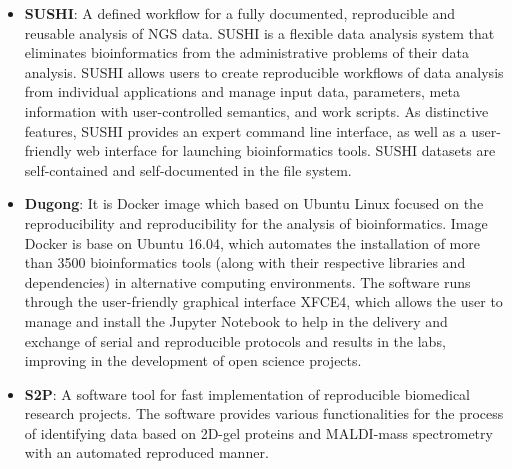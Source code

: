 \begin{itemize}
    \item \textbf{SUSHI}\cite{DBLP:journals/bmcbi/HatakeyamaORQSR16}: A defined workflow for a fully documented, reproducible and reusable analysis of NGS data. SUSHI is a flexible data analysis system that eliminates bioinformatics from the administrative problems of their data analysis. SUSHI allows users to create reproducible workflows of data analysis from individual applications and manage input data, parameters, meta information with user-controlled semantics, and work scripts. As distinctive features, SUSHI provides an expert command line interface, as well as a user-friendly web interface for launching bioinformatics tools. SUSHI datasets are self-contained and self-documented in the file system.
    \item \textbf{Dugong}\cite{DBLP:journals/bioinformatics/MenegidioJON18}: It is Docker image which based on Ubuntu Linux focused on the reproducibility and reproducibility for the analysis of bioinformatics. Image Docker is base on Ubuntu 16.04, which automates the installation of more than 3500 bioinformatics tools (along with their respective libraries and dependencies) in alternative computing environments. The software runs through the user-friendly graphical interface XFCE4, which allows the user to manage and install the Jupyter Notebook to help in the delivery and exchange of serial and reproducible protocols and results in the labs, improving in the development of open science projects.
    \item \textbf{S2P}\cite{DBLP:journals/cmpb/Lopez-Fernandez18}: A software tool for fast implementation of reproducible biomedical research projects. The software provides various functionalities for the process of identifying data based on 2D-gel proteins and MALDI-mass spectrometry with an automated reproduced manner. 
    


\end{itemize}
